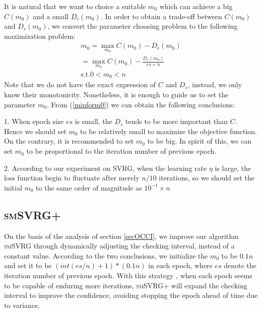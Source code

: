 \documentclass[conference]{IEEEtran}
\begin{document}
It is natural that we want to choice a suitable $m_0$  which can achieve a big $C(m_0)$ and a small $D_r(m_0)$. In order to obtain a trade-off between $C(m_0)$ and $D_r(m_0)$, we convert the parameter choosing problem to the following maximization problem:
\begin{equation}
\label{minform0}
\begin{split}
m_0 = \max\limits_{m_0} C(m_0)-D_r(m_0)\\
 = \max\limits_{m_0} C(m_0)-\frac{D_s(m_0)}{es+n}\\
\textrm{s.t.} 0<m_0<n
\end{split}
\end{equation}
Note that we do not have the exact expression of $C$ and $D_s$, instead, we only know their monotonicity. Nonetheless, it is enough to guide us to set the parameter $m_0$. From (\ref{minform0}) we can obtain the following conclusions:

1. When epoch size $es$ is small, the $D_s$ tends to be more important than $C$. Hence we should set $m_0$ to be relatively small to maximize the objective function. On the contrary, it is recommended to set $m_0$ to be big. In spirit of this, we can set $m_0$ to be proportional to the iteration number of previous epoch.

2. According to our experiment on SVRG, when the learning rate $\eta$ is large, the loss function begin to fluctuate after merely $n/10$ iterations, so we should set the initial $m_0$ to the same order of magnitude as $10^{-1} \times n$
 
 \subsection{\textsc{smSVRG+}}
 On the basis of the analysis of section \ref{secOCCI}, we improve our algorithm \textsc{smSVRG} through dynamically adjusting the checking interval, instead of a constant value. According to the two conclusions, we initialize the $m_0$ to be $0.1n$ and set it to be $(int(es/n)+1) * (0.1n)$ in each epoch, where $es$ denote the iteration number of previous epoch. With this strategy , when each epoch seems to be capable of enduring more iterations, \textsc{smSVRG+} will expand the checking interval to improve the confidence, avoiding stopping the epoch ahead of time due to variance.
 
\end{document}
